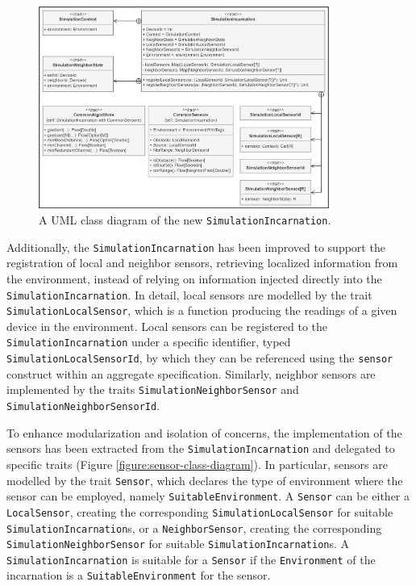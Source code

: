 \begin{figure}[!ht]
  \centering
  \includegraphics[width=0.85\textwidth]{resources/figures/simulation-incarnation-class-diagram.png}
  \caption[A UML class diagram of the updated simulation incarnation]{
    A UML class diagram of the new \texttt{SimulationIncarnation}.
  }
  \label{figure:simulation-incarnation-class-diagram}
\end{figure}

Additionally, the \texttt{SimulationIncarnation} has been improved to support
the registration of local and neighbor sensors, retrieving localized
information from the environment, instead of relying on information injected
directly into the \texttt{Simu\-lationIncarnation}. In detail, local sensors
are modelled by the trait \texttt{Simula\-tionLocalSensor}, which is a function
producing the readings of a given device in the environment. Local sensors can
be registered to the \texttt{SimulationIncar\-nation} under a specific
identifier, typed \texttt{SimulationLocalSensorId}, by which they can be
referenced using the \texttt{sensor} construct within an aggregate
specification. Similarly, neighbor sensors are implemented by the traits
\texttt{SimulationNeighbor\-Sensor} and \texttt{Simulation\-NeighborSensorId}.

To enhance modularization and isolation of concerns, the implementation of the
sensors has been extracted from the \texttt{SimulationIncarnation} and
delegated to specific traits (Figure \ref{figure:sensor-class-diagram}). In
particular, sensors are modelled by the trait \texttt{Sensor}, which declares
the type of environment where the sensor can be employed, namely
\texttt{SuitableEnviron\-ment}. A \texttt{Sensor} can be either a
\texttt{LocalSensor}, creating the corresponding
\texttt{Simula\-tion\-LocalSensor} for suitable
\texttt{SimulationIncarnation}s, or a \texttt{NeighborSensor}, creating the
corresponding \texttt{SimulationNeighborSensor} for suitable
\texttt{Simulation\-Incarnation}s. A \texttt{SimulationIncarnation} is suitable
for a \texttt{Sensor} if the \texttt{Environ\-ment} of the incarnation is a
\texttt{SuitableEnvironment} for the sensor.

